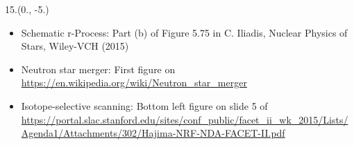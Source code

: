 \begin{textblock}{15.}(0., -5.)
    \begin{itemize}
        \item Schematic r-Process: Part (b) of Figure 5.75 in C. Iliadis, Nuclear Physics of Stars, Wiley-VCH (2015)
        \item Neutron star merger: First figure on \url{https://en.wikipedia.org/wiki/Neutron_star_merger}
        \item Isotope-selective scanning: Bottom left figure on slide 5 of \url{https://portal.slac.stanford.edu/sites/conf_public/facet_ii_wk_2015/Lists/Agenda1/Attachments/302/Hajima-NRF-NDA-FACET-II.pdf}
    \end{itemize}
\end{textblock}